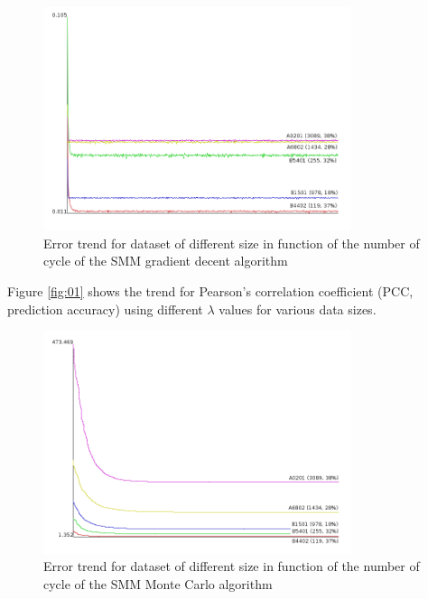 \documentclass{bioinfo}
\begin{document}
\begin{application}
\begin{figure}[!tpb]
\centerline{\includegraphics[width=9cm]{fig/smm_error.png}}
\caption{Error trend for dataset of different size in function of the number of cycle of the SMM gradient decent algorithm}
\label{fig:03}
\end{figure}

Figure \ref{fig:01} shows the trend for Pearson's correlation coefficient (PCC, prediction accuracy) using different $\lambda$ values for various data sizes.




\begin{figure}[!tpb]
\centerline{\includegraphics[width=9cm]{fig/smm_mc_error.png}}
\caption{Error trend for dataset of different size in function of the number of cycle of the SMM Monte Carlo algorithm}
\label{fig:04}
\end{figure}


\end{application}
\end{document}

